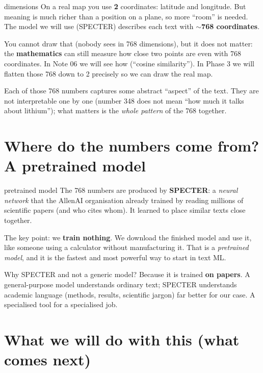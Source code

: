 \documentclass[11pt,a4paper]{article}
\begin{document}
\begin{concepto}{dimensions}
On a real map you use \textbf{2} coordinates: latitude and longitude. But meaning is much
richer than a position on a plane, so more ``room'' is needed. The model we will use
(SPECTER) describes each text with \textbf{$\sim$768 coordinates}.

You cannot draw that (nobody sees in 768 dimensions), but it does not matter: the
\textbf{mathematics} can still measure how close two points are even with 768 coordinates. In
Note 06 we will see how (``cosine similarity''). In Phase 3 we will flatten those 768 down to
2 precisely so we can draw the real map.
\end{concepto}

Each of those 768 numbers captures some abstract ``aspect'' of the text. They are not
interpretable one by one (number 348 does not mean ``how much it talks about lithium''); what
matters is the \emph{whole pattern} of the 768 together.

\section{Where do the numbers come from? A pretrained model}

\begin{concepto}{pretrained model}
The 768 numbers are produced by \textbf{SPECTER}: a \emph{neural network} that the AllenAI
organisation already trained by reading millions of scientific papers (and who cites whom).
It learned to place similar texts close together.

The key point: we \textbf{train nothing}. We download the finished model and use it, like
someone using a calculator without manufacturing it. That is a \emph{pretrained model}, and
it is the fastest and most powerful way to start in text ML.
\end{concepto}

\begin{ojo}
Why SPECTER and not a generic model? Because it is trained \textbf{on papers}. A
general-purpose model understands ordinary text; SPECTER understands academic language
(methods, results, scientific jargon) far better for our case. A specialised tool for a
specialised job.
\end{ojo}

\section{What we will do with this (what comes next)}
\end{document}
